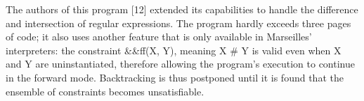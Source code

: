 The authors of this program [12] extended its capabilities to handle the
difference and intersection of regular expressions. The program hardly exceeds
three pages of code; it also uses another feature that is only available in Marseilles’
interpreters: the constraint \&\&ff(X, Y), meaning X \# Y is valid even when X
and Y are uninstantiated, therefore allowing the program’s execution to continue in
the forward mode. Backtracking is thus postponed until it is found that the
ensemble of constraints becomes unsatisfiable. 


 

\secup